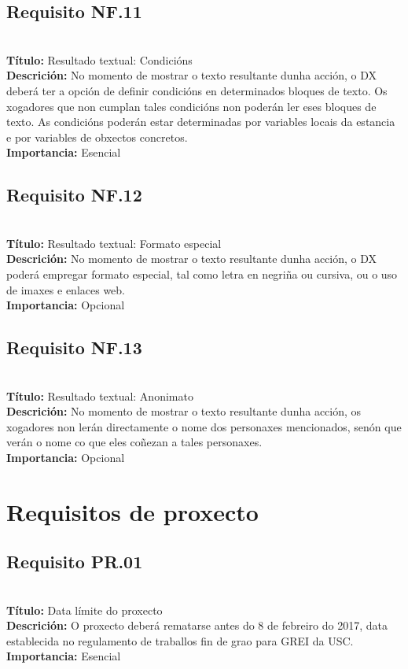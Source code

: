 \subsection{Requisito NF.11}~\\
{\bf Título:} Resultado textual: Condicións\\
{\bf Descrición:} No momento de mostrar o texto resultante dunha acción, o DX deberá ter a opción de definir condicións en determinados bloques de texto. Os xogadores que non cumplan tales condicións non poderán ler eses bloques de texto. As condicións poderán estar determinadas por variables locais da estancia e por variables de obxectos concretos.\\
{\bf Importancia:} Esencial

\subsection{Requisito NF.12}~\\
{\bf Título:} Resultado textual: Formato especial\\
{\bf Descrición:} No momento de mostrar o texto resultante dunha acción, o DX poderá empregar formato especial, tal como letra en negriña ou cursiva, ou o uso de imaxes e enlaces web.\\
{\bf Importancia:} Opcional

\subsection{Requisito NF.13}~\\
{\bf Título:} Resultado textual: Anonimato\\
{\bf Descrición:} No momento de mostrar o texto resultante dunha acción, os xogadores non lerán directamente o nome dos personaxes mencionados, senón que verán o nome co que eles coñezan a tales personaxes.\\
{\bf Importancia:} Opcional



\section{Requisitos de proxecto}
\subsection{Requisito PR.01}~\\
{\bf Título:} Data límite do proxecto\\
{\bf Descrición:} O proxecto deberá rematarse antes do 8 de febreiro do 2017,
data establecida no regulamento de traballos fin de grao para GREI da USC.\\
{\bf Importancia:} Esencial

